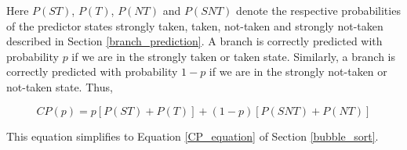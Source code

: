 \documentclass[acmtocl]{acmtrans2m}
\begin{document}
\noindent 
Here $P(ST)$, $P(T)$, $P(NT)$ and $P(SNT)$ denote the respective
probabilities of the predictor states strongly taken, taken, not-taken and
strongly not-taken described in Section \ref{branch_prediction}. A branch is
correctly predicted with probability $p$ if we are in the strongly taken or
taken state. Similarly, a branch is correctly predicted with probability $1 - p$
if we are in the strongly not-taken or not-taken state. Thus,

\[
CP(p) = p\left[P(ST) + P(T)\right] + (1 - p)\left[P(SNT) + P(NT)\right]
\]

\noindent
This equation simplifies to Equation \ref{CP_equation} of Section \ref{bubble_sort}.


\begin{received}
\end{received}
\end{document}
